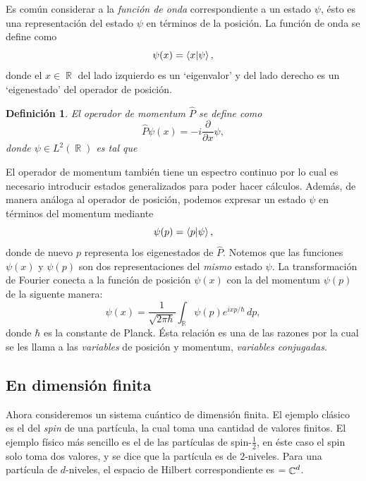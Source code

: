 \documentclass[a4paper]{report}
\DeclareMathOperator{\R}{\mathbb{R}}
\DeclareMathOperator{\C}{\mathbb{C}}
\let\H\relax
\DeclareMathOperator{\H}{\mathcal H}
\newtheorem{definition}{Definición}
\begin{document}
  Es común considerar a la \textit{función de onda}
  correspondiente a un estado $\psi$, ésto es una
  representación del estado $\psi$ en términos de la
  posición. La función de onda se define como
  \[
    \psi(x)
    = \braket{x| \psi},
  \] 
  donde el $x \in \R$ del lado izquierdo es un `eigenvalor'
  y del lado derecho es un `eigenestado' del operador de
  posición. 

  \begin{definition}
    El operador de momentum $\hat P$ se define como
    \[
      \hat P\psi(x) = -i \frac{\partial}{\partial x} \psi,
    \] 
    donde $\psi \in L^2(\R)$ es tal que
  \end{definition}

  El operador de momentum también tiene un espectro continuo
  por lo cual es necesario introducir estados generalizados
  para poder hacer cálculos. Además, de manera análoga al
  operador de posición, podemos expresar un estado $\psi$ en
  términos del momentum mediante
  \[
    \psi(p) = \braket{p| \psi},
  \] 
  donde de nuevo $p$ representa los eigenestados de $\hat
  P$. Notemos que las funciones $\psi(x)$ y $\psi(p)$ son
  dos representaciones del \textit{mismo} estado $\psi$.  La
  transformación de Fourier conecta a la función de posición
  $\psi(x)$ con la del momentum $\psi(p)$ de la siguente
  manera:
  \begin{equation}
    \psi(x)
    = \frac{1}{\sqrt{2\pi\hbar}} \int_{\R} \psi(p)e^{ixp /
    \hbar} \, dp,
  \end{equation} 
  donde $\hbar$ es la constante de Planck. Ésta relación es
  una de las razones por la cual se les llama a las
  \textit{variables} de posición y momentum,
  \textit{variables conjugadas}.  

  \subsection{En dimensión finita}

  Ahora consideremos un sistema cuántico de dimensión
  finita. El ejemplo clásico es el del \textit{spin} de una
  partícula, la cual toma una cantidad de valores finitos.
  El ejemplo físico más sencillo es el de las partículas de
  spin-$\frac{1}{2}$, en éste caso el spin solo toma dos
  valores, y se dice que la partícula es de $2$-niveles.
  Para una partícula de $d$-niveles, el espacio de Hilbert
  correspondiente es $\H  = \C^{d}$.
\end{document}
